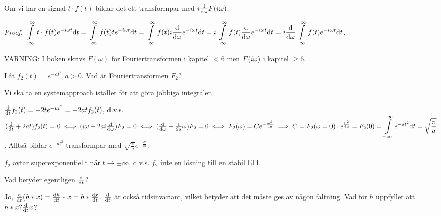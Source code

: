 \documentclass[a4paper]{article}
\begin{document}
\begin{sats}
    Om vi har en signal \(
        t\cdot f(t)
    \) bildar det ett transformpar med \(
        i \dv{\omega} F(i\omega)
    \).

    \begin{proof}
        \(
            \displaystyle\int\limits_{-\infty}^{\infty} t\cdot f(t) e^{-i\omega t} \dd t 
            = \displaystyle\int\limits_{-\infty}^{\infty} f(t) t e^{-i\omega t} \dd t 
            = \displaystyle\int\limits_{-\infty}^{\infty} f(t) i \dv{\omega} e^{-i\omega t} \dd t
            = i \displaystyle\int\limits_{-\infty}^{\infty} f(t) \dv{\omega} e^{-i\omega t} \dd t
            = i \dv{\omega} \displaystyle\int\limits_{-\infty}^{\infty} f(t) e^{-i\omega t} \dd t
        \).
    \end{proof}
\end{sats}


VARNING: I boken skrivs \(
    F(\omega)
\) för Fouriertransformen i kapitel \(
    < 6
\) men \(
    F(i\omega)
\) i kapitel \(
    \geq 6
\).

\begin{ex}
    Låt \(
        f_2(t) = e^{-at^2}, a > 0
    \). Vad är Fouriertransformen \(
        F_2
    \)?

    Vi ska ta en systemapproach istället för att göra jobbiga integraler.

    \(
        \dv{t} f_2(t) = -2t e^{-at^2} = -2atf_2(t)
    \), d.v.s.\ \(
             (\dv{t} + 2at)f_2(t) = 0 
        \iff (i\omega + 2ai \dv{\omega})F_2 = 0
        \iff (\dv{\omega} + \frac{1}{2a} \omega) F_2 = 0
        \iff F_2(\omega) = Ce^{-\frac{\omega^2}{4a}}
        \implies C = F_2(\omega=0)\cdot e^{\frac{0^2}{4a}} 
        = F_2(0)
        = \displaystyle\int\limits_{-\infty}^{\infty} e^{-at^2}\dd t
        = \sqrt{\frac{\pi}{a}}
    \). Alltså bildar \(
        e^{-at^2}
    \) transformpar med \(
        \sqrt{\frac{\pi}{a}} e^{-\frac{\omega^2}{4a}}
    \). 
    \begin{anm}
        \(
            f_2
        \) avtar superexponentiellt när \(
            t \to \pm \infty
        \), d.v.s. \(
            f_2 
        \) inte en lösning till en stabil LTI.
    \end{anm}
\end{ex}


Vad betyder egentligen \(
    \dv{t}
\)?

Jo, \(
    \dv{t} (h*x) = \dv{h}{t} * x = h * \dv{x}{t}
\). \(
    \dv{t}
\) är också tidsinvariant, vilket betyder att det måste ges av någon faltning.
Vad för \(
    h
\) uppfyller att \(
    h * x ? \dv{t} x
\)?
\end{document}
